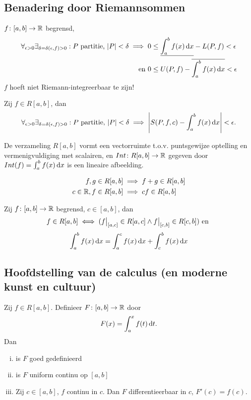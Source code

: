 \documentclass{2wa40summary}
\begin{document}
		\subsection{Benadering door Riemannsommen}
			\begin{theorem}
				$ f\colon [a,b] \to \mathbb{R}  $ begrensd,
				\begin{align*}
					\forall_{\epsilon >0} \exists_{\delta = \delta (\epsilon,f)>0}: P \text{ partitie, } \abs{P}<\delta \implies 0 &\le \ul{\int_a^b f(x) \d x} - L(P,f) < \epsilon  \\
					\text{ en }0 &\le U(P,f) - \overline{\int_a^b f(x)\d x} <\epsilon
				 \end{align*}
				 \opm $f$ hoeft niet Riemann-integreerbaar te zijn!
			\end{theorem}
			\begin{theorem}
				Zij $ f \in R[a,b] $, dan
				\[ 
					\forall_{\epsilon >0} \exists_{\delta = \delta (\epsilon,f)>0}: P \text{ partitie, } \abs{P}<\delta \implies \abs{S(P,f,c) - \int_a^b f(x) \d x} < \epsilon.
				 \]
			\end{theorem}
			\begin{theorem}[\text{[K]} 6.3.1]
				De verzameling $R[a,b]$ vormt een vectorruimte t.o.v. puntsgewijze optelling en vermenigvuldiging met scalairen, en $ \mathop{Int}\colon  R[a,b] \to \mathbb{R} $ gegeven door $ \mathop{Int}(f) = \int_a^b f(x)\mathop{}\!\mathrm{d} x $ is een lineaire afbeelding.
				\begin{gevolg}
					\begin{align*}
						f,g \in R[a,b] &\implies f+g \in R[a,b] \\
						c \in \mathbb{R}, f\in R[a,b] &\implies cf \in R[a,b]
					 \end{align*}
				\end{gevolg}
			\end{theorem}
			\begin{theorem}
				Zij $f\colon [a,b] \to \mathbb{R}$ begrensd, $c\in [a,b]$, dan
				\[ 
					f \in R[a,b] \iff (\restr{f}{[a,c]} \in R[a,c] \wedge \restr{f}{[c,b]} \in R[c,b]) \text{ en }
				 \]
				 \[ 
					 \int_a^b f(x)\mathop{}\!\mathrm{d} x = \int_a^c f(x) \mathop{}\!\mathrm{d} x + \int_c^b f(x) \mathop{}\!\mathrm{d} x
				  \]
			\end{theorem}
			
		\subsection{Hoofdstelling van de calculus (en moderne kunst en cultuur)}
			\begin{theorem}
				Zij $f \in R[a,b]$. Definieer $ F\colon [a,b] \to \mathbb{R} $ door 
				\[ 
					F(x)=\int_a^x f(t)\mathop{}\!\mathrm{d} t.
				 \]
				 Dan
				 \begin{enumerate}[(i)]
				 	\item is $F$ goed gedefinieerd
				 	\item is $F$ uniform continu op $ [a,b] $
				 	\item Zij $ c \in [a,b] $, $f$ continu in $c$. Dan $F$ differentieerbaar in $c$, $ F'(c)=f(c) $.
				 \end{enumerate}
			\end{theorem}
			
\end{document}
